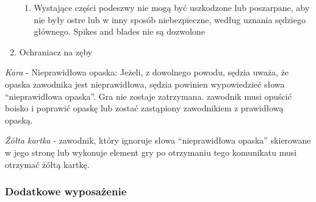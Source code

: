 \documentclass[12pt]{article}
\begin{document}
\begin{enumerate}
  \begin{enumerate}
  \item
        Wystające części podeszwy nie mogą być uszkodzone lub poszarpane,
    aby nie były ostre lub w inny sposób niebezpieczne, według uznania
    sędziego głównego. Spikes and blades nie są dozwolone
      \end{enumerate}
\item
    Ochraniacz na zęby
  \end{enumerate}

\emph{Kara} - Nieprawidłowa opaska: Jeżeli, z dowolnego powodu, sędzia
uważa, że opaska zawodnika jest nieprawidłowa, sędzia powinien
wypowiedzieć słowa ``nieprawidłowa opaska''. Gra nie zostaje zatrzymana.
zawodnik musi opuścić boisko i poprawić opaskę lub zostać zastąpiony
zawodnikiem z prawidłową opaską.

\emph{Żółta kartka} - zawodnik, który ignoruje słowa ``nieprawidłowa
opaska'' skierowane w jego stronę lub wykonuje element gry po otrzymaniu
tego komunikatu musi otrzymać żółtą kartkę.

\subsubsection{Dodatkowe wyposażenie}
\end{document}
